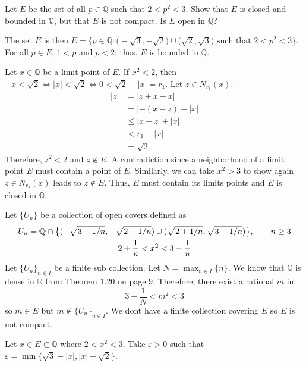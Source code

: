 \begin{exercise}
  Let \(E\) be the set of all \(p\in\mathbb{Q}\) such that \(2 < p^2 < 3\).
  Show that \(E\) is closed and bounded in \(\mathbb{Q}\), but that \(E\) is
  not compact.
  Is \(E\) open in \(\mathbb{Q}\)?
  \par\smallskip
  The set \(E\) is then
  \(E = \bigl\{p\in\mathbb{Q}\colon\bigl(-\sqrt{3},-\sqrt{2}\bigr)\cup
  \bigl(\sqrt{2},\sqrt{3}\bigr)\text{ such that } 2 < p^2 < 3\bigr\}\).
  For all \(p\in E\), \(1 < p\) and \(p < 2\); thus, \(E\) is bounded in \(\mathbb{Q}\).
  \par\smallskip
  Let \(x\in\mathbb{Q}\) be a limit point of \(E\).
  If \(x^2 < 2\), then \(\pm x < \sqrt{2}\iff\lvert x\rvert < \sqrt{2}\iff 0 < \sqrt{2} - \lvert x\rvert = r_1\).
  Let \(z\in N_{r_1}(x)\).
  \[
  	\begin{aligned}
		\lvert z\rvert &= \lvert z + x - x\rvert\\
		&= \lvert -(x - z) + \lvert x\rvert\\
		&\leq\lvert x - z\rvert + \lvert x\rvert\\
		&< r_1 + \lvert x\rvert\\
		&= \sqrt{2}
	\end{aligned}
  \]
  Therefore, \(z^2 < 2\) and \(z\not\in E\).
  A contradiction since a neighborhood of a limit point \(E\) must contain a point of \(E\).
  Similarly, we can take \(x^2 > 3\) to show again \(z\in N_{r_2}(x)\) leads to \(z\not\in E\).
  Thus, \(E\) must contain its limits points and \(E\) is closed in \(\mathbb{Q}\).
  \par\smallskip
  Let \(\{U_n\}\) be a collection of open covers defined as
  \begin{gather}
  	U_n = \mathbb{Q}\cap\big\{(-\sqrt{3 - 1/n}, -\sqrt{2 + 1/n}) \cup (\sqrt{2 + 1/n}, \sqrt{3 - 1/n})\big\},
	\qquad n\ge 3\notag\\
	2 + \frac{1}{n} < x^2 < 3 - \frac{1}{n}\notag
  \end{gather}
  Let \(\{U_n\}_{n\in I}\) be a finite sub collection.
  Let \(N = \max_{n\in I}\{n\}\).
  We know that \(\mathbb{Q}\) is dense in \(\mathbb{R}\) from Theorem \(1.20\) on page \(9\).
  Therefore, there exist a rational \(m\) in 
  \[
  	3 - \frac{1}{N} < m^2 < 3
  \]
  so \(m\in E\) but \(m\not\in \{U_n\}_{n\in I}\).
  We dont have a finite collection covering \(E\) so \(E\) is not compact.
  \par\smallskip
  Let \(x\in E\subset\mathbb{Q}\) where \(2 < x^2 < 3\).
  Take \(\varepsilon > 0\) such that \(\varepsilon = \min\{\sqrt{3} - \lvert x\rvert, \lvert x\rvert - \sqrt{2}\}\).

\end{exercise}
